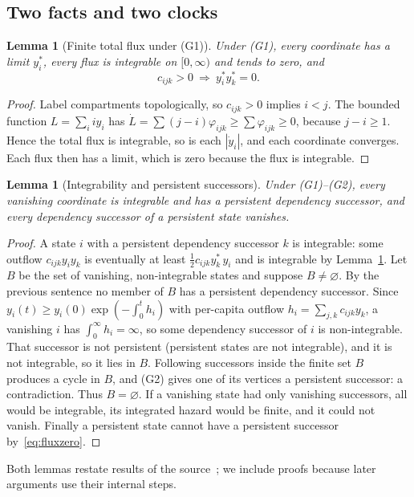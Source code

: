 \documentclass[11pt,a4paper]{article}
\newtheorem{lemma}[theorem]{Lemma}
\theoremstyle{definition}\newtheorem{definition}[theorem]{Definition}
\theoremstyle{remark}\newtheorem{remark}[theorem]{Remark}
\begin{document}
\subsection{Two facts and two clocks}

\begin{lemma}[Finite total flux under (G1)]
\label{lem:flux}
Under (G1), every coordinate has a limit $y_i^*$, every flux is
integrable on $[0,\infty)$ and tends to zero, and
\begin{equation}
c_{ijk}>0\ \Longrightarrow\ y_i^*y_k^*=0.
\label{eq:fluxzero}
\end{equation}
\end{lemma}
\begin{proof}
Label compartments topologically, so $c_{ijk}>0$ implies $i<j$. The
bounded function $L=\sum_i iy_i$ has
$\dot L=\sum(j-i)\varphi_{ijk}\ge\sum\varphi_{ijk}\ge0$, because
$j-i\ge1$. Hence the total flux is integrable, so is each
$|\dot y_i|$, and each coordinate converges. Each flux then has a
limit, which is zero because the flux is integrable.
\end{proof}

\begin{lemma}[Integrability and persistent successors]
\label{lem:integrability}
Under (G1)--(G2), every vanishing coordinate is integrable and has a
persistent dependency successor, and every dependency successor of a
persistent state vanishes.
\end{lemma}
\begin{proof}
A state $i$ with a persistent dependency successor $k$ is integrable:
some outflow $c_{ijk}y_iy_k$ is eventually at least
$\tfrac12c_{ijk}y_k^*\,y_i$ and is integrable by Lemma~\ref{lem:flux}.
Let $B$ be the set of vanishing, non-integrable states and suppose
$B\ne\varnothing$. By the previous sentence no member of $B$ has a
persistent dependency successor. Since
$y_i(t)\ge y_i(0)\exp(-\int_0^th_i)$ with per-capita outflow
$h_i=\sum_{j,k}c_{ijk}y_k$, a vanishing $i$ has $\int_0^\infty h_i=\infty$,
so some dependency successor of $i$ is non-integrable. That successor
is not persistent (persistent states are not integrable), and it is not
integrable, so it lies in $B$. Following successors inside the finite
set $B$ produces a cycle in $B$, and (G2) gives one of its vertices a
persistent successor: a contradiction. Thus $B=\varnothing$. If a
vanishing state had only vanishing successors, all would be integrable,
its integrated hazard would be finite, and it could not vanish.
Finally a persistent state cannot have a persistent successor
by~\eqref{eq:fluxzero}.
\end{proof}
Both lemmas restate results of the source~\cite[Theorem~2, p.~17;
Theorem~3, p.~19]{CCM}; we include proofs because later arguments use
their internal steps.
\end{document}
